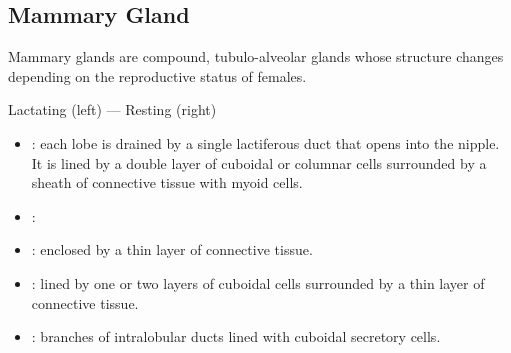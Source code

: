 \subsection{Mammary Gland}
Mammary glands are compound, tubulo-alveolar glands whose structure changes depending on the reproductive status of females.

Lactating (left) --- Resting (right)
\begin{center}
\end{center}
\begin{multicols}{2}
\begin{itemize}
  \item {}:  each lobe is drained by a single lactiferous duct that opens into the nipple. It is lined by a double layer of cuboidal or columnar cells surrounded by a sheath of connective tissue with myoid cells.
  
  \begin{center}
  \end{center}
  
  \vspace*{15pt}
  \item {}: 
  \vspace{20pt}
  \begin{center}
  \end{center}
  
  \item {}: enclosed by a thin layer of connective tissue.
  
  \begin{center}
  \end{center}
  
  \item {}: lined by one or two layers of cuboidal cells surrounded by a thin layer of connective tissue.
  
  \begin{center}
  \end{center}
  
  \item {}:  branches of intralobular ducts lined with cuboidal secretory cells. 
  

\end{itemize}
\end{multicols}
